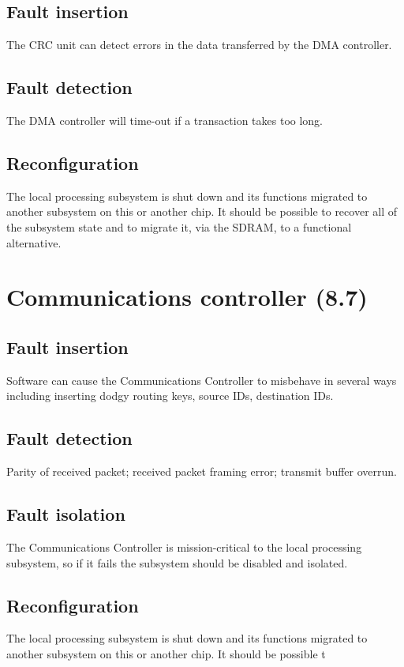 \documentclass[oneside, a4paper, 11pt]{memoir}
\begin{document}
\subsection*{Fault insertion}
The CRC unit can detect errors in the data transferred by the DMA controller.
\subsection*{Fault detection}
The DMA controller will time-out if a transaction takes too long.
\subsection*{Reconfiguration}
The local processing subsystem is shut down and its functions migrated to another subsystem on
this or another chip. It should be possible to recover all of the subsystem state and to migrate it, via
the SDRAM, to a functional alternative.

\section{Communications controller (8.7)}
\subsection*{Fault insertion}
Software can cause the Communications Controller to misbehave in several ways including
inserting dodgy routing keys, source IDs, destination IDs.
\subsection*{Fault detection}
Parity of received packet; received packet framing error; transmit buffer overrun.
\subsection*{Fault isolation}
The Communications Controller is mission-critical to the local processing subsystem, so if it fails
the subsystem should be disabled and isolated.
\subsection*{Reconfiguration}
The local processing subsystem is shut down and its functions migrated to another subsystem on
this or another chip. It should be possible t
\end{document}
